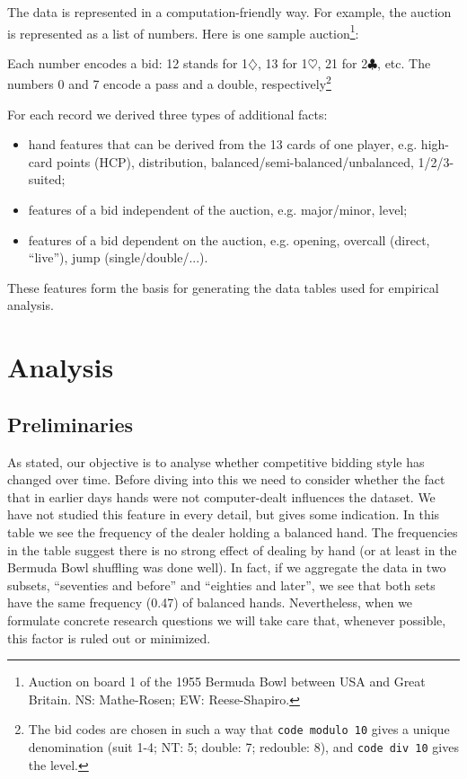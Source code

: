 \documentclass{llncs}
\begin{document}
The data is represented in a computation-friendly way. For example,
the auction is represented as a list of numbers. Here is one sample
auction\footnote{%
  Auction on board 1 of the 1955 Bermuda Bowl between USA and Great
  Britain. NS: Mathe-Rosen; EW: Reese-Shapiro.}:

\begin{code}
    [12,13,7,0,0,21,22,31,32,0,0,0]
\end{code}

Each number encodes a bid: 12 stands for 1$\diamondsuit$, 13 for
1$\heartsuit$, 21 for 2$\clubsuit$, etc. The numbers 0 and 7 encode a
pass and a double, respectively\footnote{%
  The bid codes are chosen in such a way that \texttt{code modulo 10}
  gives a unique denomination (suit 1-4; NT: 5; double: 7; redouble:
  8), and \texttt{code div 10} gives the level.}

For each record we derived three types of additional facts: 
\begin{itemize}
\item hand features that can be derived from the 13 cards of one
  player, e.g. high-card points (HCP), distribution,
  balanced/semi-balanced/unbalanced, 1/2/3-suited;
\item features of a bid independent of the auction, e.g.  major/minor,
  level;
\item features of a bid dependent on the auction, e.g. opening,
  overcall (direct, ``live''), jump (single/double/...).
\end{itemize}
 
These features form the basis for generating the data tables used for
empirical analysis. 

\section{Analysis}
\label{sec:analysis}

\subsection{Preliminaries}

As stated, our objective is to analyse whether competitive bidding
style has changed over time.  Before diving into this we need to
consider whether the fact that in earlier days hands were not
computer-dealt influences the dataset. We have not studied this
feature in every detail, but  gives some
indication. In this table we see the frequency of the dealer holding a
balanced hand. The frequencies in the table suggest there is no strong
effect of dealing by hand (or at least in the Bermuda Bowl shuffling
was done well). In fact, if we aggregate the data in two subsets,
``seventies and before'' and ``eighties and later'', we see that both
sets have the same frequency (0.47) of balanced hands. Nevertheless,
when we formulate concrete research questions we will take care that,
whenever possible, this factor is ruled out or minimized.
\end{document}
